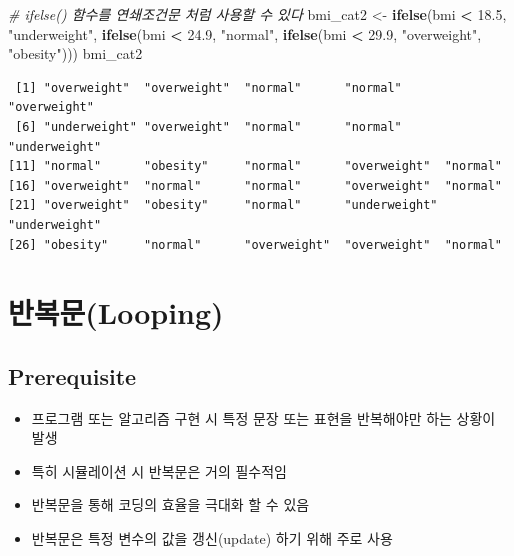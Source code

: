 \documentclass[
  11pt,
]{krantz}
\newenvironment{Shaded}{\begin{snugshade}}{\end{snugshade}}
\newcommand{\CommentTok}[1]{\textcolor[rgb]{0.37,0.37,0.37}{\textit{#1}}}
\newcommand{\FloatTok}[1]{\textcolor[rgb]{0.06,0.06,0.06}{#1}}
\newcommand{\KeywordTok}[1]{\textcolor[rgb]{0.27,0.27,0.27}{\textbf{#1}}}
\newcommand{\NormalTok}[1]{#1}
\newcommand{\OperatorTok}[1]{\textcolor[rgb]{0.43,0.43,0.43}{\textbf{#1}}}
\newcommand{\StringTok}[1]{\textcolor[rgb]{0.5,0.5,0.5}{#1}}
\providecommand{\tightlist}{%
  \setlength{\itemsep}{0pt}\setlength{\parskip}{0pt}}
\begin{document}
\begin{Shaded}
\begin{Highlighting}[]
\CommentTok{# ifelse() 함수를 연쇄조건문 처럼 사용할 수 있다}
\NormalTok{bmi_cat2 <-}\StringTok{ }\KeywordTok{ifelse}\NormalTok{(bmi }\OperatorTok{<}\StringTok{ }\FloatTok{18.5}\NormalTok{, }\StringTok{"underweight"}\NormalTok{, }
            \KeywordTok{ifelse}\NormalTok{(bmi }\OperatorTok{<}\StringTok{ }\FloatTok{24.9}\NormalTok{, }\StringTok{"normal"}\NormalTok{, }
            \KeywordTok{ifelse}\NormalTok{(bmi }\OperatorTok{<}\StringTok{ }\FloatTok{29.9}\NormalTok{, }\StringTok{"overweight"}\NormalTok{, }\StringTok{"obesity"}\NormalTok{)))}
\NormalTok{bmi_cat2}
\end{Highlighting}
\end{Shaded}

\begin{verbatim}
 [1] "overweight"  "overweight"  "normal"      "normal"      "overweight" 
 [6] "underweight" "overweight"  "normal"      "normal"      "underweight"
[11] "normal"      "obesity"     "normal"      "overweight"  "normal"     
[16] "overweight"  "normal"      "normal"      "overweight"  "normal"     
[21] "overweight"  "obesity"     "normal"      "underweight" "underweight"
[26] "obesity"     "normal"      "overweight"  "overweight"  "normal"     
\end{verbatim}

\normalsize

\hypertarget{looping}{%
\section{반복문(Looping)}\label{looping}}

\hypertarget{loop-pre}{%
\subsection*{Prerequisite}\label{loop-pre}}


\begin{itemize}
\tightlist
\item
  프로그램 또는 알고리즘 구현 시 특정 문장 또는 표현을 반복해야만 하는 상황이 발생
\item
  특히 시뮬레이션 시 반복문은 거의 필수적임
\item
  반복문을 통해 코딩의 효율을 극대화 할 수 있음
\item
  반복문은 특정 변수의 값을 갱신(update) 하기 위해 주로 사용
\end{itemize}
\end{document}
